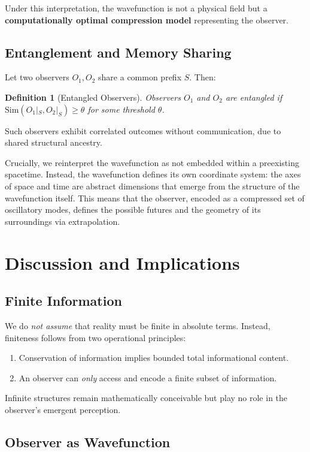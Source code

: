 \documentclass[11pt]{article}
\newtheorem{definition}{Definition}
\begin{document}
Under this interpretation, the wavefunction is not a physical field but a \textbf{computationally optimal compression model} representing the observer.

\subsection{Entanglement and Memory Sharing}

Let two observers \(O_1, O_2\) share a common prefix \(S\). Then:

\begin{definition}[Entangled Observers]
    Observers \(O_1\) and \(O_2\) are entangled if \(\mathrm{Sim}(O_1|_S, O_2|_S)\ge\theta\) for some threshold \(\theta\).
\end{definition}

Such observers exhibit correlated outcomes without communication, due to shared structural ancestry.

Crucially, we reinterpret the wavefunction as not embedded within a preexisting spacetime. Instead, the wavefunction defines its own coordinate system: the axes of space and time are abstract dimensions that emerge from the structure of the wavefunction itself. This means that the observer, encoded as a compressed set of oscillatory modes, defines the possible futures and the geometry of its surroundings via extrapolation.

\section{Discussion and Implications}

\subsection{Finite Information}

We do \emph{not assume} that reality must be finite in absolute terms. Instead, finiteness follows from two operational principles:
\begin{enumerate}
    \item Conservation of information implies bounded total informational content.
    \item An observer can \emph{only} access and encode a finite subset of information.
\end{enumerate}
Infinite structures remain mathematically conceivable but play no role in the observer’s emergent perception.

\subsection{Observer as Wavefunction}
\end{document}
